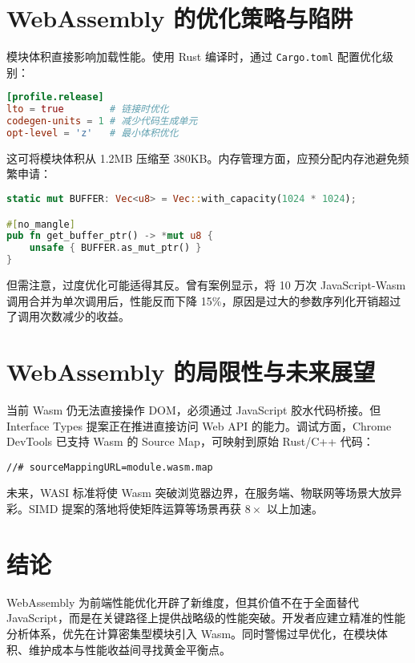 \chapter{WebAssembly 的优化策略与陷阱}
模块体积直接影响加载性能。使用 Rust 编译时，通过 \verb!Cargo.toml! 配置优化级别：\par
\begin{lstlisting}[language=toml]
[profile.release]
lto = true        # 链接时优化
codegen-units = 1 # 减少代码生成单元
opt-level = 'z'   # 最小体积优化
\end{lstlisting}
这可将模块体积从 1.2MB 压缩至 380KB。内存管理方面，应预分配内存池避免频繁申请：\par
\begin{lstlisting}[language=rust]
static mut BUFFER: Vec<u8> = Vec::with_capacity(1024 * 1024);

#[no_mangle]
pub fn get_buffer_ptr() -> *mut u8 {
    unsafe { BUFFER.as_mut_ptr() }
}
\end{lstlisting}
但需注意，过度优化可能适得其反。曾有案例显示，将 10 万次 JavaScript-Wasm 调用合并为单次调用后，性能反而下降 15\%{}，原因是过大的参数序列化开销超过了调用次数减少的收益。\par
\chapter{WebAssembly 的局限性与未来展望}
当前 Wasm 仍无法直接操作 DOM，必须通过 JavaScript 胶水代码桥接。但 Interface Types 提案正在推进直接访问 Web API 的能力。调试方面，Chrome DevTools 已支持 Wasm 的 Source Map，可映射到原始 Rust/C++ 代码：\par
\begin{lstlisting}
//# sourceMappingURL=module.wasm.map
\end{lstlisting}
未来，WASI 标准将使 Wasm 突破浏览器边界，在服务端、物联网等场景大放异彩。SIMD 提案的落地将使矩阵运算等场景再获 $8\times$ 以上加速。\par
\chapter{结论}
WebAssembly 为前端性能优化开辟了新维度，但其价值不在于全面替代 JavaScript，而是在关键路径上提供战略级的性能突破。开发者应建立精准的性能分析体系，优先在计算密集型模块引入 Wasm。同时警惕过早优化，在模块体积、维护成本与性能收益间寻找黄金平衡点。\par
